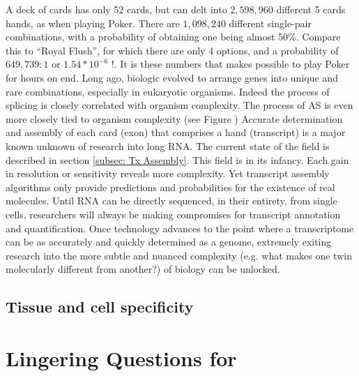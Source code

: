    A deck of cards has only 52 cards, but can delt into $2,598,960$ different 5 cards hands, as when playing Poker. There are $1,098,240$ different single-pair combinations, with a probability of obtaining one being almost 50\%. Compare this to ``Royal Flush'', for which there are only 4 options, and a probability of $649,739:1$ or $1.54 * 10^{-6}$ !. It is these numbers that makes possible to play Poker for hours on end. Long ago, biologic evolved to arrange genes into unique and rare combinations, especially in eukaryotic organisms. Indeed the process of splicing is closely correlated with organism complexity. The process of AS is even more closely tied to organism complexity (see Figure 
    )
    Accurate determination and assembly of each card (exon) that comprises a hand (transcript) is a major known unknown of research into long RNA. The current state of the field is described in section \ref{subsec: Tx Assembly}. This field is in its infancy. Each gain in resolution or sensitivity reveals more complexity. Yet transcript assembly algorithms only provide predictions and probabilities for the existence of real molecules. Until RNA can be directly sequenced, in their entirety, from single cells, researchers will always be making compromises for transcript annotation and quantification. Once technology advances to the point where a transcriptome can be as accurately and quickly determined as a genome, extremely exiting research into the more subtle and nuanced complexity (e.g. what makes one twin molecularly different from another?) of biology can be unlocked.


  \subsection{Tissue and cell specificity}
    \label{Disc:subsec:Tissue-specific Tx expression}


\section{Lingering Questions for \dscam{}}
  \label{Disc:sec:Dscam}

